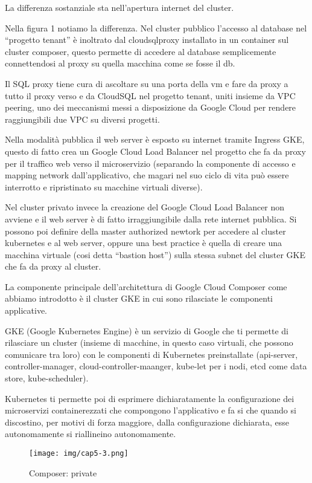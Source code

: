 \documentclass[a4paper,12pt]{report}
\begin{document}
La differenza sostanziale sta nell’apertura internet del cluster. 

Nella figura 1 notiamo la differenza. Nel cluster pubblico l’accesso al database nel “progetto tenant” è inoltrato dal cloudsqlproxy installato in un container sul cluster composer, questo permette di accedere al database semplicemente connettendosi al proxy su quella macchina come se fosse il db.

Il SQL proxy tiene cura di ascoltare su una porta della vm e fare da proxy a tutto il proxy verso e da CloudSQL nel progetto tenant, uniti insieme da VPC peering, uno dei meccanismi messi a disposizione da Google Cloud per rendere raggiungibili due VPC su diversi progetti.

Nella modalità pubblica il web server è esposto su internet tramite Ingress GKE, questo di fatto crea un Google Cloud Load Balancer nel progetto che fa da proxy per il traffico web verso il microservizio (separando la componente di accesso e mapping network dall’applicativo, che magari nel suo ciclo di vita può essere interrotto e ripristinato su macchine virtuali diverse).

Nel cluster privato invece la creazione del Google Cloud Load Balancer non avviene e il web server è di fatto irraggiungibile dalla rete internet pubblica. Si possono poi definire della master authorized newtork per accedere al cluster kubernetes e al web server, oppure una best practice è quella di creare una macchina virtuale (cosi detta “bastion host”) sulla stessa subnet del cluster GKE che fa da proxy al cluster.

La componente principale dell’architettura di Google Cloud Composer come abbiamo introdotto è il cluster GKE in cui sono rilasciate le componenti applicative.

GKE (Google Kubernetes Engine) è un servizio di Google che ti permette di rilasciare un cluster (insieme di macchine, in questo caso virtuali, che possono comunicare tra loro) con le componenti di Kubernetes preinstallate (api-server, controller-manager, cloud-controller-maanger, kube-let per i nodi, etcd come data store, kube-scheduler).

Kubernetes ti permette poi di esprimere dichiaratamente la configurazione dei microservizi containerezzati che compongono l’applicativo e fa si che quando si discostino, per motivi di forza maggiore, dalla configurazione dichiarata, esse autonomamente si riallineino autonomamente.

\begin{figure}[h]
    \centering
    \texttt{[image: img/cap5-3.png]}
    \caption{Composer: private}
\end{figure}
\end{document}
